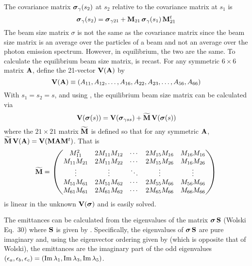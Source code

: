 The covariance matrix ${\boldsymbol{\sigma}}_\gamma(s_2)$ at $s_2$ relative to the covariance matrix at $s_1$ is
\begin{equation}
  {\boldsymbol{\sigma}}_\gamma(s_2) = {\boldsymbol{\sigma}}_{\gamma21} + {\bf M}_{21} \, {\boldsymbol{\sigma}}_\gamma(s_1) \, {\bf M}_{21}^t
  \label{ssmsm}
\end{equation}
The beam size matrix $\sigma$ is not the same as the covariance matrix since the beam size matrix is
an average over the particles of a beam and not an average over the photon emission
spectrum. However, in equilibrium, the two are the same. To calculate the equilibrium beam size
matrix,  is recast. For any symmetric $6\times6$ matrix ${\bf A}$, define the 21-vector
${\bf V}({\bf A})$ by
\begin{equation}
  {\bf V}({\bf A}) \equiv (A_{11}, A_{12}, \ldots, A_{16}, A_{22}, A_{23}, \ldots, A_{56}, A_{66})
\end{equation}
With $s_1 = s_2 = s$, and using , the equilibrium beam size matrix can be calculated via
\begin{equation}
  {\bf V}({\boldsymbol{\sigma}}(s)) = {\bf V}({\boldsymbol{\sigma}}_{\gamma ss}) + \widetilde{{\bf M}} \, {\bf V}({\boldsymbol{\sigma}}(s))
  \label{vsmv}
\end{equation}
where the $21\times21$ matrix $\widetilde{{\bf M}}$ is defined so that for any symmetric ${\bf A}$, $\widetilde{{\bf M}} \, {\bf V}({\bf A}) =
{\bf V}({\bf M}{\bf A}{\bf M}^t)$. That is
\begin{equation}
  \widetilde{{\bf M}} = \begin{pmatrix}
    M_{11}^2      & 2 M_{11} M_{12} & \cdots & 2 M_{15} M_{16} & M_{16} M_{16} \\
    M_{11} M_{21} & 2 M_{11} M_{22} & \cdots & 2 M_{15} M_{26} & M_{16} M_{26} \\
    \vdots        & \vdots          & \ddots & \vdots          & \vdots      \\
    M_{51} M_{61} & 2 M_{51} M_{62} & \cdots & 2 M_{55} M_{66} & M_{56} M_{66} \\
    M_{61} M_{61} & 2 M_{61} M_{62} & \cdots & 2 M_{65} M_{66} & M_{66} M_{66}
  \end{pmatrix}
\end{equation}
 is linear in the unknown ${\bf V}({\boldsymbol{\sigma}})$ and is easily solved.

The emittances can be calculated from the eigenvalues of the matrix ${\boldsymbol{\sigma}} \, {\bf S}$
(Wolski\cite{b:wolski.coupling} Eq.~30) where ${\bf S}$ is given by . Specifically, the
eigenvalues of ${\boldsymbol{\sigma}} \, {\bf S}$ are pure imaginary and, using the eigenvector ordering given by
 (which is opposite that of Wolski), the emittances are the imaginary part of the odd
eigenvalues $(\epsilon_a, \epsilon_b, \epsilon_c) = (\operatorname{Im}{\lambda_1}, \operatorname{Im}{\lambda_3}, \operatorname{Im}{\lambda_5})$.

